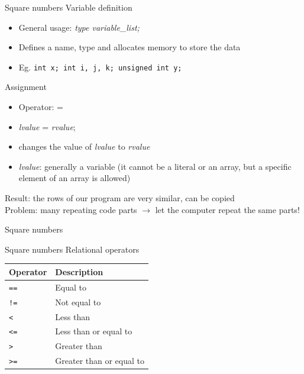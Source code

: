 \documentclass[usenames,dvipsnames,aspectratio=169]{beamer}
\newcommand{\kiemel}[1]{{\color{kiemelesszin}#1}}
\begin{document}
\begin{frame}{Square numbers}
  Variable definition
  \begin{itemize}
    \item General usage: \emph{type variable\_list;}
    \item Defines a name, type and allocates memory to store the data
    \item Eg. \kiemel{\texttt{int x; int i, j, k; unsigned int y;}}
  \end{itemize}
  Assignment
  \begin{itemize}
    \item Operator: \kiemel{=}
    \item \emph{lvalue} \kiemel{=} \emph{rvalue};
    \item changes the value of \emph{lvalue} to \emph{rvalue}
    \item \emph{lvalue}: generally a variable (it cannot be a literal or an array, but a specific element of an array is allowed)
  \end{itemize}
  \vfill
  Result: the rows of our program are very similar, can be copied\\
  Problem: many repeating code parts $\to$ let the computer repeat the same parts!
\end{frame}

\begin{frame}{Square numbers}
  \footnotesize
  \begin{exampleblock}{}
          
  \end{exampleblock}
\end{frame}

\begin{frame}{Square numbers}
  Relational operators
  \begin{center}
    \begin{tabular}{ll}
      Operator & Description \\ \hline
      \texttt{==} & Equal to \\
      \texttt{!=} & Not equal to \\
      \texttt{<} & Less than \\
      \texttt{<=} & Less than or equal to \\
      \texttt{>} & Greater than \\
      \texttt{>=} & Greater than or equal to \\
    \end{tabular}
  \end{center}
\end{frame}
\end{document}
